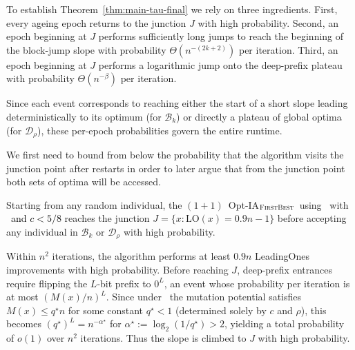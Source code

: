 To establish Theorem~\ref{thm:main-tau-final} we rely on three ingredients.
First, every ageing epoch returns to the junction $J$ with high probability.
Second, an epoch beginning at $J$ performs sufficiently long jumps to reach the beginning of the block-jump slope with probability $\Theta(n^{-(2k+2)})$ per iteration.
Third, an epoch beginning at $J$ performs a logarithmic jump onto the deep-prefix plateau with probability $\Theta(n^{-\beta})$ per iteration.

Since each event corresponds to reaching either the start of a short slope leading deterministically to its optimum (for $\mathcal{B}_k$) or directly a plateau of global optima (for $\mathcal{D}_\rho$), these per-epoch probabilities govern the entire runtime.

We first need to bound from below the probability that the algorithm visits the junction point after restarts in order to later argue that from the junction point both sets of optima will be accessed.

\begin{lemma} \label{lem:junction-first-density-Bk}
	Starting from any random individual, the $(1+1)$~Opt-IA$_{\textsc{FirstBest}}$~using \IPHfcm{}~with \linHD~\textcolor{black}{and $c<5/8$}  reaches the junction $J = \{x : \mathrm{LO}(x)=0.9n-1\}$ before accepting any individual in $\mathcal{B}_k$ or $\mathcal{D}_\rho$ with high probability.
\end{lemma}

Within $n^2$ iterations, the algorithm performs at least $0.9n$ LeadingOnes 
improvements with high probability.  
Before reaching $J$, deep-prefix entrances require flipping the $L$-bit prefix 
to $0^L$, an event whose probability per iteration is at most $(M(x)/n)^L$.  
Since under \linHD\ the mutation potential satisfies $M(x) \le q^\star n$ for 
some constant $q^\star < 1$ (determined solely by $c$ and $\rho$), this becomes 
$(q^\star)^L = n^{-\alpha^\star}$ for $\alpha^\star := \log_2(1/q^\star) > 2$, 
yielding a total probability of $o(1)$ over $n^2$ iterations.
Thus the slope is climbed to $J$ with high probability.


